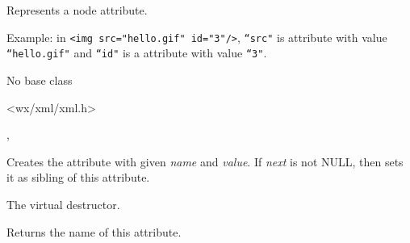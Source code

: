 
\section{}\label{wxxmlattribute}

Represents a node attribute.

Example: in {\tt <img src="hello.gif" id="3"/>}, {\tt ``src"} is attribute with value
{\tt ``hello.gif"} and {\tt ``id"} is a attribute with value {\tt ``3"}.


No base class


<wx/xml/xml.h>


, 



\label{wxxmlattributewxxmlattribute}




Creates the attribute with given {\it name} and {\it value}.
If {\it next} is not NULL, then sets it as sibling of this attribute.

\label{wxxmlattributedtor}


The virtual destructor.

\label{wxxmlattributegetname}


Returns the name of this attribute.

\label{wxxmlattributegetnext}

